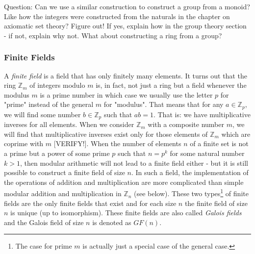 Question: Can we use a similar construction to construct a group from a monoid? Like how the integers were constructed from the naturals in the chapter on axiomatic set theory? Figure out! If yes, explain how in the group theory section - if not, explain why not. What about constructing a ring from a group?







\subsubsection{Finite Fields}
A \emph{finite field} is a field that has only finitely many elements. It turns out that the ring $\mathbb{Z}_m$ of integers modulo $m$ is, in fact, not just a ring but a field whenever the modulus $m$ is a prime number in which case we usually use the letter $p$ for "prime" instead of the general $m$ for "modulus". That means that for any $a \in \mathbb{Z}_p$, we will find some number $b \in \mathbb{Z}_p$ such that $a b = 1$. That is: we have multiplicative inverses for all elements. When we consider $\mathbb{Z}_m$ with a composite number $m$, we will find that multiplicative inverses exist only for those elements of $\mathbb{Z}_m$ which are coprime with $m$ [VERIFY!]. When the number of elements $n$ of a finite set is not a prime but a power of some prime $p$ such that $n = p^k$ for some natural number $k > 1$, then modular arithmetic will not lead to a finite field either - but it is still possible to construct a finite field of size $n$. In such a field, the implementation of the operations of addition and multiplication are more complicated than simple modular addition and multiplication in $\mathbb{Z}_n$ (see below). These two types\footnote{The case for prime $m$ is actually just a special case of the general case.} of finite fields are the only finite fields that exist and for each size $n$ the finite field of size $n$ is unique (up to isomorphism). These finite fields are also called \emph{Galois fields} and the Galois field of size $n$ is denoted as $GF(n)$. 


